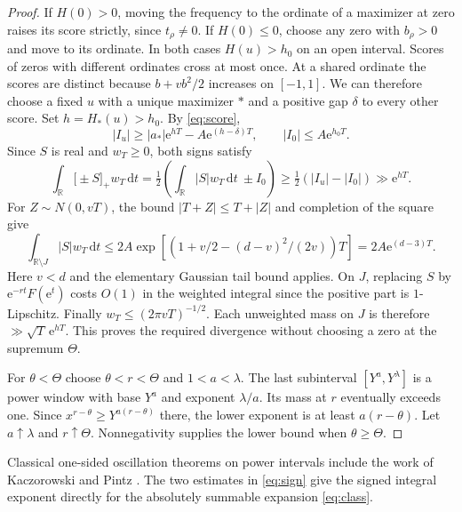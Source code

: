 \documentclass[11pt,a4paper]{article}
\newcommand{\dd}{\,\mathrm d}
\newcommand{\ee}{\mathrm e}
\newcommand{\pos}[1]{\bigl[#1\bigr]_+}
\begin{document}
\begin{proof}
If $H(0)>0$, moving the frequency to the ordinate of a maximizer at zero raises its score strictly, since $t_\rho\ne0$. If $H(0)\le0$, choose any zero with $b_\rho>0$ and move to its ordinate. In both cases $H(u)>h_0$ on an open interval. Scores of zeros with different ordinates cross at most once. At a shared ordinate the scores are distinct because $b+vb^2/2$ increases on $[-1,1]$. We can therefore choose a fixed $u$ with a unique maximizer $*$ and a positive gap $\delta$ to every other score. Set $h=H_*(u)>h_0$. By \eqref{eq:score},
\[
 |I_u|\ge |a_*|\ee^{hT}-A\ee^{(h-\delta)T},
 \qquad |I_0|\le A\ee^{h_0T}.
\]
Since $S$ is real and $w_T\ge0$, both signs satisfy
\begin{equation}\label{eq:sign}
 \int_{\mathbb R}\pos{\pm S}w_T\dd t
  =\tfrac12\left(\int_{\mathbb R}|S|w_T\dd t\ \pm I_0\right)
    \ge\tfrac12(|I_u|-|I_0|)\gg\ee^{hT}.
\end{equation}
For $Z\sim N(0,vT)$, the bound $|T+Z|\le T+|Z|$ and completion of the square give
\[
 \int_{\mathbb R\setminus J}|S|w_T\dd t
 \le 2A\exp\!\left[\left(1+v/2-(d-v)^2/(2v)\right)T\right]
 =2A\ee^{(d-3)T}.
\]
Here $v<d$ and the elementary Gaussian tail bound applies. On $J$, replacing $S$ by $\ee^{-rt}F(\ee^t)$ costs $O(1)$ in the weighted integral since the positive part is $1$-Lipschitz. Finally $w_T\le(2\pi vT)^{-1/2}$. Each unweighted mass on $J$ is therefore $\gg\sqrt T\,\ee^{hT}$. This proves the required divergence without choosing a zero at the supremum $\Theta$.

For $\theta<\Theta$ choose $\theta<r<\Theta$ and $1<a<\lambda$. The last subinterval $[Y^a,Y^\lambda]$ is a power window with base $Y^a$ and exponent $\lambda/a$. Its mass at $r$ eventually exceeds one. Since $x^{r-\theta}\ge Y^{a(r-\theta)}$ there, the lower exponent is at least $a(r-\theta)$. Let $a\uparrow\lambda$ and $r\uparrow\Theta$. Nonnegativity supplies the lower bound when $\theta\ge\Theta$.
\end{proof}
Classical one-sided oscillation theorems on power intervals include the work of Kaczorowski and Pintz \cite{kp}. The two estimates in \eqref{eq:sign} give the signed integral exponent directly for the absolutely summable expansion \eqref{eq:class}.
\end{document}

